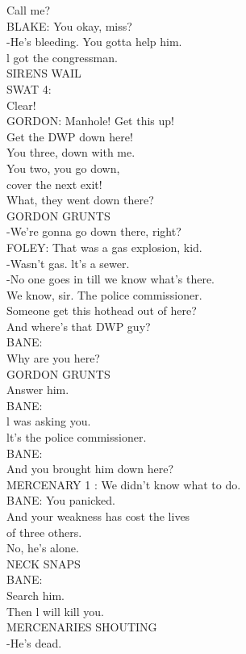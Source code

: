 \documentclass{article}
\begin{document}
\begin{multicols}{3}
Call me?\\
BLAKE: You okay, miss?\\
-He's bleeding. You gotta help him.\\
l got the congressman.\\
SIRENS WAIL\\
SWAT 4:\\
Clear!\\
GORDON: Manhole! Get this up!\\
Get the DWP down here!\\
You three, down with me.\\
You two, you go down,\\
cover the next exit!\\
What, they went down there?\\
GORDON GRUNTS\\
-We're gonna go down there, right?\\
FOLEY: That was a gas explosion, kid.\\
-Wasn't gas. lt's a sewer.\\
-No one goes in till we know what's there.\\
We know, sir. The police commissioner.\\
Someone get this hothead out of here?\\
And where's that DWP guy?\\
BANE:\\
Why are you here?\\
GORDON GRUNTS\\
Answer him.\\
BANE:\\
l was asking you.\\
lt's the police commissioner.\\
BANE:\\
And you brought him down here?\\
MERCENARY 1 : We didn't know what to do.\\
BANE: You panicked.\\
And your weakness has cost the lives\\
of three others.\\
No, he's alone.\\
NECK SNAPS\\
BANE:\\
Search him.\\
Then l will kill you.\\
MERCENARIES SHOUTING\\
-He's dead.\\

\end{multicols}
\end{document}
